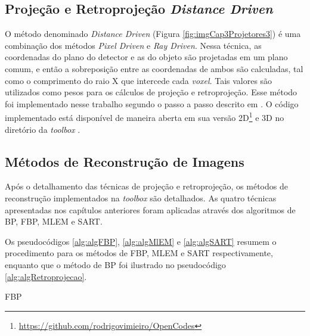 \subsection{Projeção e Retroprojeção \textit{Distance Driven}} 

O método denominado \textit{Distance Driven} (Figura \ref{fig:imgCap3Projetores3}) é uma combinação dos métodos \textit{Pixel Driven} e \textit{Ray Driven}. Nessa técnica, as coordenadas do plano do detector e as do objeto são projetadas em um plano comum, e então a sobreposição entre as coordenadas de ambos são calculadas, tal como o comprimento do raio X que intercede cada \textit{voxel}. Tais valores são utilizados como pesos para os cálculos de projeção e retroprojeção. Esse método foi implementado nesse trabalho segundo o passo a passo descrito em . O código implementado está disponível de maneira aberta em sua versão \acs{2D}\footnote{\url{https://github.com/rodrigovimieiro/OpenCodes}} e \acs{3D} no diretório da \textit{toolbox} \cite{de2002distance,de2004distance}.

\subsection{Métodos de Reconstrução de Imagens} 

Após o detalhamento das técnicas de projeção e retroprojeção, os métodos de reconstrução implementados na \textit{toolbox} são detalhados. As quatro técnicas apresentadas nos capítulos anteriores foram aplicadas através dos algoritmos de \acs{BP}, \acs{FBP}, \acs{MLEM} e \acs{SART}. 

Os pseudocódigos \ref{alg:algFBP}, \ref{alg:algMlEM} e \ref{alg:algSART} resumem o procedimento para os métodos de \acs{FBP}, \acs{MLEM} e \acs{SART} respectivamente, enquanto que o método de \acs{BP} foi ilustrado no pseudocódigo \ref{alg:algRetroprojecao}.  

\begin{algorithm}[ht]
	\caption{\acs{FBP}}
	\label{alg:algFBP}
\end{algorithm}


